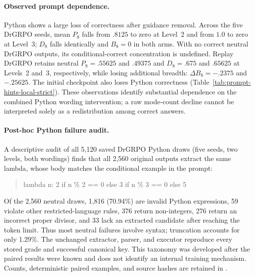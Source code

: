 \documentclass{article}
\newcommand{\1}{\mathbf 1}
\theoremstyle{remark}
\theoremstyle{definition}
\theoremstyle{plain}
\begin{document}
\paragraph{Observed prompt dependence.}
Python shows a large loss of correctness after guidance removal. Across the
five DrGRPO seeds, mean $P_8$ falls from $.8125$ to zero at Level~2 and from
$1.0$ to zero at Level~3; $D_8$ falls identically and $B_8=0$ in both arms.
With no correct neutral DrGRPO outputs, its conditional-correct concentration
is undefined. Replay DrGRPO retains neutral $P_8=.55625$ and $.49375$ and
$D_8=.675$ and $.65625$ at Levels~2 and~3, respectively, while losing
additional breadth: $\Delta B_8=-.2375$ and $-.25625$. The initial checkpoint
also loses Python correctness (Table~\ref{tab:prompt-hints-local-strict}).
These observations identify substantial dependence on the combined Python
wording intervention; a raw mode-count decline cannot be interpreted solely
as a redistribution among correct answers.


\paragraph{Post-hoc Python failure audit.}
A descriptive audit of all 5,120 saved DrGRPO Python draws (five seeds,
two levels, both wordings) finds that all 2,560 original outputs extract
the same lambda, whose body matches the conditional example in the prompt:
\begin{quote}\footnotesize\ttfamily
lambda n: 2 if n \% 2 == 0 else 3 if n \% 3 == 0 else 5
\end{quote}
Of the 2,560 neutral draws, 1,816 (70.94\%) are invalid Python expressions,
59 violate other restricted-language rules, 376 return non-integers,
276 return an incorrect proper divisor, and 33 lack an extracted candidate
after reaching the token limit. Thus most neutral failures involve syntax;
truncation accounts for only 1.29\%. The unchanged extractor, parser, and
executor reproduce every stored grade and successful canonical key.
This taxonomy was developed after the paired results were known and does
not identify an internal training mechanism. Counts, deterministic paired
examples, and source hashes are retained in
.
\end{document}
